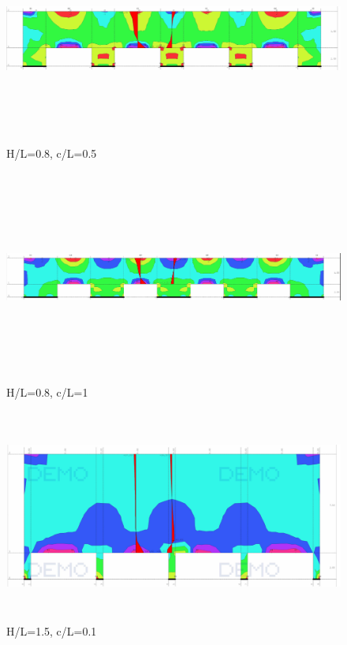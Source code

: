 \documentclass[11pt, a4paper]{article}
\begin{document}
\begin{figure}[H]
	\includegraphics[width=\textwidth, height=7cm]{Slike/H-L_0-8 (0-5).png}
	\caption{H/L=0.8, c/L=0.5}
\end{figure}

\begin{figure}[H]
	\includegraphics[width=\textwidth, height=7cm]{Slike/H-L_0-8 (1-0).png}
	\caption{H/L=0.8, c/L=1}
\end{figure}
\newpage
\begin{figure}[H]
	\includegraphics[width=\textwidth, height=7cm]{Slike/H-L_1-5 (0-1).png}
	\caption{H/L=1.5, c/L=0.1}
\end{figure}
\end{document}

